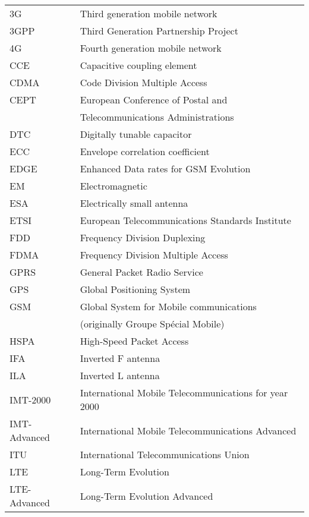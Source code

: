\begin{tabular}{ll}
3G          & Third generation mobile network \\
3GPP        & Third Generation Partnership Project \\
4G          & Fourth generation mobile network \\
CCE         & Capacitive coupling element\\
CDMA        & Code Division Multiple Access \\
CEPT        & European Conference of Postal and \\
            & Telecommunications Administrations \\
DTC         & Digitally tunable capacitor\\
ECC         & Envelope correlation coefficient\\
EDGE        & Enhanced Data rates for GSM Evolution \\
EM          & Electromagnetic\\
ESA         & Electrically small antenna\\
ETSI        & European Telecommunications Standards Institute\\
FDD         & Frequency Division Duplexing \\
FDMA        & Frequency Division Multiple Access \\
GPRS        & General Packet Radio Service \\
GPS         & Global Positioning System \\
GSM         & Global System for Mobile communications \\
            & (originally Groupe Spécial Mobile) \\
HSPA        & High-Speed Packet Access \\
IFA         & Inverted F antenna\\
ILA         & Inverted L antenna\\
IMT-2000    & International Mobile Telecommunications for year 2000 \\
IMT-Advanced & International Mobile Telecommunications Advanced \\
ITU         & International Telecommunications Union \\
LTE         & Long-Term Evolution \\
LTE-Advanced & Long-Term Evolution Advanced\\

\end{tabular}
